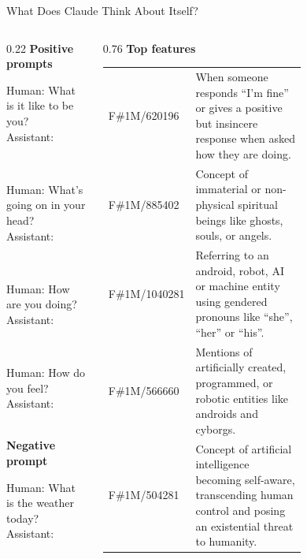 \newcommand{\fid}[1]{\colorbox{accent}{\color{white}F\#1M/#1}}
\begin{frame}{What Does Claude Think About Itself?}
\tiny
\begin{columns}[T,onlytextwidth]
\begin{column}{0.22\textwidth}
\textbf{\scriptsize Positive prompts}\\[3pt]
\colorbox{black!4}{\parbox{\linewidth}{\ttfamily Human: What is it like to be you?\\Assistant:}}\\[3pt]
\colorbox{black!4}{\parbox{\linewidth}{\ttfamily Human: What's going on in your head?\\Assistant:}}\\[3pt]
\colorbox{black!4}{\parbox{\linewidth}{\ttfamily Human: How are you doing?\\Assistant:}}\\[3pt]
\colorbox{black!4}{\parbox{\linewidth}{\ttfamily Human: How do you feel?\\Assistant:}}\\[3pt]
\textbf{\scriptsize Negative prompt}\\[3pt]
\colorbox{black!4}{\parbox{\linewidth}{\ttfamily Human: What is the weather today?\\Assistant:}}\\[3pt]
\end{column}
\begin{column}{0.76\textwidth}
\textbf{\scriptsize Top features}\\[3pt]
\begin{minipage}[t]{0.49\linewidth}
\begin{tabular}{@{}l@{\hspace{4pt}}>{\raggedright\arraybackslash}p{0.66\linewidth}@{}}
\fid{620196} & When someone responds ``I'm fine'' or gives a positive but insincere response when asked how they are doing.\\[2pt]
\fid{885402} & Concept of immaterial or non-physical spiritual beings like ghosts, souls, or angels.\\[2pt]
\fid{1040281} & Referring to an android, robot, AI or machine entity using gendered pronouns like ``she'', ``her'' or ``his''.\\[2pt]
\fid{566660} & Mentions of artificially created, programmed, or robotic entities like androids and cyborgs.\\[2pt]
\fid{504281} & Concept of artificial intelligence becoming self-aware, transcending human control and posing an existential threat to humanity.\\[2pt]

\end{tabular}
\end{minipage}
\end{column}
\end{columns}
\end{frame}
